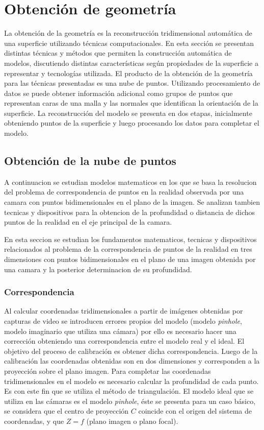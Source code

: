 \chapter{Obtención de geometría}

La obtención de la geometría es la reconstrucción tridimensional automática de una superficie utilizando técnicas computacionales.
En esta sección se presentan distintas técnicas y métodos que permiten la construcción automática de modelos, discutiendo distintas características según propiedades de la superficie a representar y tecnologías utilizada.
El producto de la obtención de la geometría para las técnicas presentadas es una nube de puntos. Utilizando procesamiento de datos se puede obtener información adicional como grupos de puntos que representan caras de una malla y las normales que identifican la orientación de la superficie. La reconstrucción del modelo se presenta en dos etapas, inicialmente obteniendo puntos de la superficie y luego procesando los datos para completar el modelo.

\section{Obtención de la nube de puntos}


A continuacion se estudian modelos matematicos en los que se basa la resolucion del problema de correspondencia de puntos en la realidad observada por una camara con puntos bidimensionales en el plano de la imagen. Se analizan tambien tecnicas y dispositivos para la obtencion de la profundidad o distancia de dichos puntos de la realidad en el eje principal de la camara.

En esta seccion se estudian los fundamentos matematicos, tecnicas y dispositivos relacionados al problema de la correspondencia de puntos de la realidad en tres dimensiones con puntos bidimensionales en el plano de una imagen obtenida por una camara y la posterior determinacion de su profundidad.



\subsection{Correspondencia}

Al calcular coordenadas tridimensionales a partir de imágenes obtenidas por capturas de video se introducen errores propios del modelo (modelo \emph{pinhole}, modelo imaginario que utiliza una cámara) por ello es necesario hacer una corrección obteniendo una correspondencia entre el modelo real y el ideal. El objetivo del proceso de calibración es obtener dicha correspondencia. Luego de la calibración las coordenadas obtenidas son en dos dimensiones y corresponden a la proyección sobre el plano imagen. Para completar las coordenadas tridimensionales en el modelo es necesario calcular la profundidad de cada punto. Es con este fin que se utiliza el método de triangulación. El modelo ideal que se utiliza en las cámaras es el modelo \emph{pinhole}, éste se presenta para un caso básico, se considera que el centro de proyección $C$ coincide con el origen del sistema de coordenadas, y que $Z = f$ (plano imagen o plano focal).

